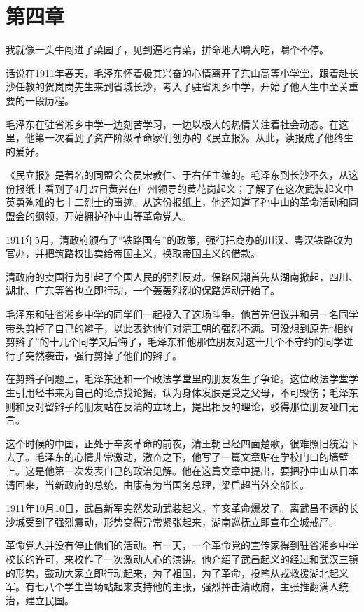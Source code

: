 \documentclass[../../dazhuan.tex]{subfiles}
\begin{document}
\chapter*{第四章}
\begin{pref}
	我就像一头牛闯进了菜园子，见到遍地青菜，拼命地大嚼大吃，嚼个不停。
\end{pref}

话说在1911年春天，毛泽东怀着极其兴奋的心情离开了东山高等小学堂，跟着赴长沙任教的贺岚岗先生来到省城长沙，考入了驻省湘乡中学，开始了他人生中至关重要的一段历程。

毛泽东在驻省湘乡中学一边刻苦学习，一边以极大的热情关注着社会动态。在这里，他第一次看到了资产阶级革命家们创办的《民立报》。从此，读报成了他终生的爱好。

《民立报》是著名的同盟会会员宋教仁、于右任主编的。毛泽东到长沙不久，从这份报纸上看到了4月27日黄兴在广州领导的黄花岗起义；了解了在这次武装起义中英勇殉难的七十二烈士的事迹。从这份报纸上，他还知道了孙中山的革命活动和同盟会的纲领，开始拥护孙中山等革命党人。

1911年5月，清政府颁布了“铁路国有”的政策，强行把商办的川汉、粤汉铁路改为官办，并把筑路权出卖给帝国主义，换取帝国主义的借款。

清政府的卖国行为引起了全国人民的强烈反对。保路风潮首先从湖南掀起，四川、湖北、广东等省也立即行动，一个轰轰烈烈的保路运动开始了。

毛泽东和驻省湘乡中学的同学们一起投入了这场斗争。他首先倡议并和另一名同学带头剪掉了自己的辫子，以此表达他们对清王朝的强烈不满。可没想到原先“相约剪辫子”的十几个同学又后悔了，毛泽东和他那位朋友对这十几个不守约的同学进行了突然袭击，强行剪掉了他们的辫子。

在剪辫子问题上，毛泽东还和一个政法学堂里的朋友发生了争论。这位政法学堂学生引用经书来为自己的论点找论据，认为身体发肤是受之父母，不可毁伤；毛泽东则和反对留辫子的朋友站在反清的立场上，提出相反的理论，驳得那位朋友哑口无言。

这个时候的中国，正处于辛亥革命的前夜，清王朝已经四面楚歌，很难照旧统治下去了。毛泽东的心情非常激动，激奋之下，他写了一篇文章贴在学校门口的墙壁上。这是他第一次发表自己的政治见解。他在这篇文章中提出，要把孙中山从日本请回来，当新政府的总统，由康有为当国务总理，梁启超当外交部长。

1911年10月10日，武昌新军突然发动武装起义，辛亥革命爆发了。离武昌不远的长沙城受到了强烈震动，形势变得异常紧张起来，湖南巡抚立即宣布全城戒严。

革命党人并没有停止他们的活动。有一天，一个革命党的宣传家得到驻省湘乡中学校长的许可，来校作了一次激动人心的演讲。他介绍了武昌起义的经过和武汉三镇的形势，鼓动大家立即行动起来，为了祖国，为了革命，投笔从戎救援湖北起义军。有七八个学生当场站起来支持他的主张，强烈抨击清政府，主张推翻满人统治，建立民国。
\end{document}
